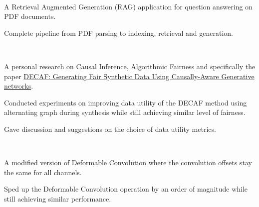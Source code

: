 \\
\begin{zitemize}
    \item A Retrieval Augmented Generation (RAG) application for question answering on PDF
    documents.
    \item Complete pipeline from PDF parsing to indexing, retrieval and generation.
\end{zitemize}


\\
\begin{zitemize}
    \item A personal research on Causal Inference, Algorithmic Fairness and specifically the paper \href{https://arxiv.org/abs/2110.12884}{DECAF: Generating Fair Synthetic Data Using Causally-Aware Generative networks}.
    \item Conducted experiments on improving data utility of the DECAF method using alternating graph during synthesis while still achieving similar level of  fairness.
    \item Gave discussion and suggestions on the choice of data utility metrics.
\end{zitemize}

\\
\begin{zitemize}
    \item A modified version of Deformable Convolution where the convolution offsets
    stay the same for all channels.
    \item Sped up the Deformable Convolution operation by an order of magnitude while still achieving similar performance.
\end{zitemize}

